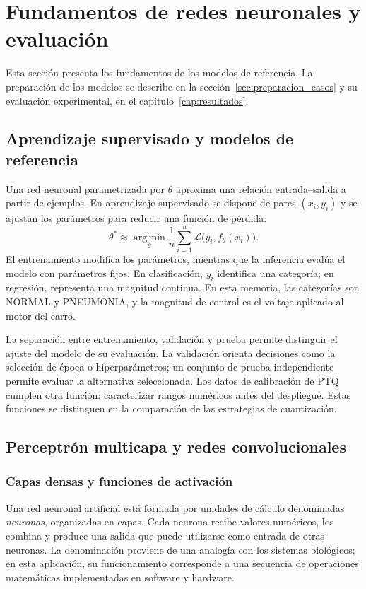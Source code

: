 \section{Fundamentos de redes neuronales y evaluación}\label{cap:fundamentos}
Esta sección presenta los fundamentos de los modelos de referencia. La preparación de los modelos se describe en la sección~\ref{sec:preparacion_casos} y su evaluación experimental, en el capítulo~\ref{cap:resultados}.

\subsection{Aprendizaje supervisado y modelos de referencia}
Una red neuronal parametrizada por $\theta$ aproxima una relación entrada--salida a partir de ejemplos. En aprendizaje supervisado se dispone de pares $(x_i,y_i)$ y se ajustan los parámetros para reducir una función de pérdida:
\begin{equation}
\theta^*\approx\operatorname*{arg\,min}_{\theta}\frac{1}{n}\sum_{i=1}^{n}\mathcal L\big(y_i,f_\theta(x_i)\big).
\end{equation}
El entrenamiento modifica los parámetros, mientras que la inferencia evalúa el modelo con parámetros fijos. En clasificación, $y_i$ identifica una categoría; en regresión, representa una magnitud continua. En esta memoria, las categorías son NORMAL y PNEUMONIA, y la magnitud de control es el voltaje aplicado al motor del carro.

La separación entre entrenamiento, validación y prueba permite distinguir el ajuste del modelo de su evaluación. La validación orienta decisiones como la selección de época o hiperparámetros; un conjunto de prueba independiente permite evaluar la alternativa seleccionada. Los datos de calibración de PTQ cumplen otra función: caracterizar rangos numéricos antes del despliegue. Estas funciones se distinguen en la comparación de las estrategias de cuantización.

\subsection{Perceptrón multicapa y redes convolucionales}
\subsubsection{Capas densas y funciones de activación}
Una red neuronal artificial está formada por unidades de cálculo denominadas \emph{neuronas}, organizadas en capas. Cada neurona recibe valores numéricos, los combina y produce una salida que puede utilizarse como entrada de otras neuronas. La denominación proviene de una analogía con los sistemas biológicos; en esta aplicación, su funcionamiento corresponde a una secuencia de operaciones matemáticas implementadas en software y hardware.


